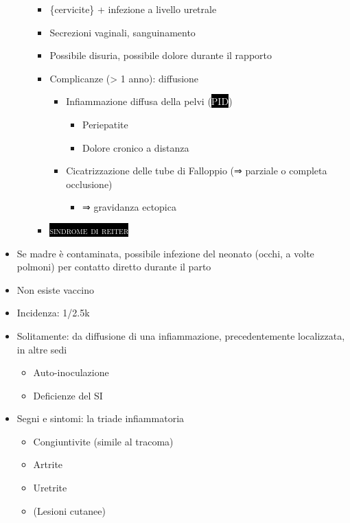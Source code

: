 \documentclass[italian,]{article}
\providecommand{\tightlist}{%
  \setlength{\itemsep}{0pt}\setlength{\parskip}{0pt}}
\newcommand{\pat}[1]{\colorbox{black}{\textcolor{white}{\textsc{#1}}}}
\renewcommand{\ss}[1]{\textsc{#1}}
\newcommand{\normalbox}[2]{\begin{tcolorbox}[title=#1]#2\end{tcolorbox}} %
\begin{document}
\begin{itemize}
\begin{itemize}
    \begin{itemize}
    \item
      \ss\{cervicite\} + infezione a livello uretrale
    \item
      Secrezioni vaginali, sanguinamento
    \item
      Possibile disuria, possibile dolore durante il rapporto
    \item
      Complicanze (\textgreater{} 1 anno): diffusione

      \begin{itemize}
      \tightlist
      \item
        Infiammazione diffusa della pelvi (\pat{PID})

        \begin{itemize}
        \tightlist
        \item
          Periepatite
        \item
          Dolore cronico a distanza
        \end{itemize}
      \item
        Cicatrizzazione delle tube di Falloppio (⇒ parziale o completa
        occlusione)

        \begin{itemize}
        \tightlist
        \item
          ⇒ gravidanza ectopica
        \end{itemize}
      \end{itemize}
    \item
      \pat{sindrome di reiter}
    \end{itemize}
  \end{itemize}
\item
  Se madre è contaminata, possibile infezione del neonato (occhi, a
  volte polmoni) per contatto diretto durante il parto
\item
  Non esiste vaccino
\end{itemize}

\normalbox{Sindrome di Reiter (artrite reattiva)}{
\begin{itemize}
\tightlist
\item Incidenza: 1/2.5k
\item Solitamente: da diffusione di una infiammazione, precedentemente localizzata, in altre sedi
  \begin{itemize}
  \tightlist
  \item Auto-inoculazione
  \item Deficienze del SI
  \end{itemize}
\item Segni e sintomi: la triade infiammatoria
  \begin{itemize}
  \tightlist
  \item Congiuntivite (simile al tracoma)
  \item Artrite
  \item Uretrite
  \item (Lesioni cutanee)
  \end{itemize}
\end{itemize}
}
\end{document}
